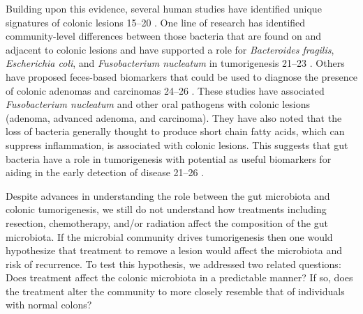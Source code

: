 \documentclass[12pt,]{article}
\providecommand{\DIFaddtex}[1]{{\protect\color{blue}\uwave{#1}}} %
\providecommand{\DIFaddbegin}{} %
\providecommand{\DIFaddend}{} %
\providecommand{\DIFdelbegin}{} %
\providecommand{\DIFdelend}{} %
\providecommand{\DIFadd}[1]{\texorpdfstring{\DIFaddtex{#1}}{#1}} %
\begin{document}
Building upon this evidence, several human studies have identified
unique signatures of colonic lesions \DIFdelbegin %
\DIFdelend \DIFaddbegin \DIFadd{(}\DIFaddend 15--20\DIFdelbegin %
\DIFdelend \DIFaddbegin \DIFadd{)}\DIFaddend . One line of research has
identified community-level differences between those bacteria that are
found on and adjacent to colonic lesions and have supported a role for
\emph{Bacteroides fragilis}, \emph{Escherichia coli}, and
\emph{Fusobacterium nucleatum} in tumorigenesis \DIFdelbegin %
\DIFdelend \DIFaddbegin \DIFadd{(}\DIFaddend 21--23\DIFdelbegin %
\DIFdelend \DIFaddbegin \DIFadd{)}\DIFaddend . Others have
proposed feces-based biomarkers that could be used to diagnose the
presence of colonic adenomas and carcinomas \DIFdelbegin %
\DIFdelend \DIFaddbegin \DIFadd{(}\DIFaddend 24--26\DIFdelbegin %
\DIFdelend \DIFaddbegin \DIFadd{)}\DIFaddend . These studies have
associated \emph{Fusobacterium nucleatum} and other oral pathogens with
colonic lesions (adenoma, advanced adenoma, and carcinoma). They have
also noted that the loss of bacteria generally thought to produce short
chain fatty acids, which can suppress inflammation, is associated with
colonic lesions. This suggests that gut bacteria have a role in
tumorigenesis with potential as useful biomarkers for aiding in the
early detection of disease \DIFdelbegin %
\DIFdelend \DIFaddbegin \DIFadd{(}\DIFaddend 21--26\DIFdelbegin %
\DIFdelend \DIFaddbegin \DIFadd{)}\DIFaddend .

Despite advances in understanding the role between the gut microbiota
and colonic tumorigenesis, we still do not understand how treatments
including resection, chemotherapy, and/or radiation affect the
composition of the gut microbiota. If the microbial community drives
tumorigenesis then one would hypothesize that treatment to remove a
lesion would affect the microbiota and risk of recurrence. To test this
hypothesis, we addressed two related questions: Does treatment affect
the colonic microbiota in a predictable manner? If so, does the
treatment alter the community to more closely resemble that of
individuals with normal colons?
\end{document}
